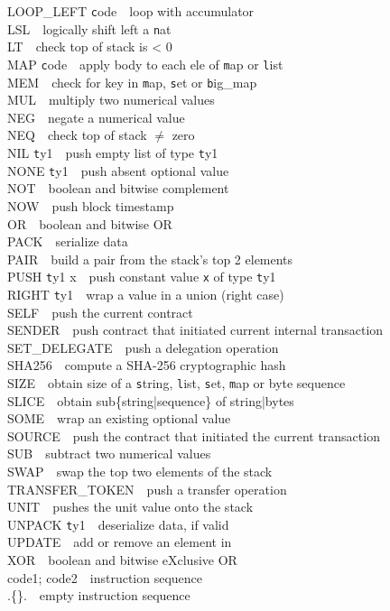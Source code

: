 \documentclass[10pt]{article}
\newcommand{\command}[2]{#1~\dotfill{}~#2\\} %
\begin{document}
\begin{multicols}{3}
\begin{flushright}
    \command{LOOP\_LEFT {\texttt code}}{loop with accumulator}
    \command{LSL}{logically shift left a {\texttt nat}}
    \command{LT}{check top of stack is < 0}
    \command{MAP {\texttt code}}{apply body to each ele of {\texttt map} or {\texttt list}}
    \command{MEM}{check for key in {\texttt map}, {\texttt set} or {\texttt big\_map}}
    \command{MUL}{multiply two numerical values}
    \command{NEG}{negate a numerical value}
    \command{NEQ}{check top of stack $\neq$ zero}
    \command{NIL {\texttt ty1}}{push empty list of type {\texttt ty1}}
    \command{NONE {\texttt ty1}}{push absent optional value}
    \command{NOT}{boolean and bitwise complement}
    \command{NOW}{push block timestamp}
    \command{OR}{boolean and bitwise OR}
    \command{PACK}{serialize data}
    \command{PAIR}{build a pair from the stack's top 2 elements}
    \command{PUSH {\texttt ty1 x}}{push constant value {\texttt x} of type {\texttt ty1}}
    \command{RIGHT {\texttt ty1}}{wrap a value in a union (right case)}
    \command{SELF}{push the current contract}
    \command{SENDER}{push contract that initiated current internal transaction}
    \command{SET\_DELEGATE}{push a delegation operation}
    \command{SHA256}{compute a SHA-256 cryptographic hash}
    \command{SIZE}{obtain size of a {\texttt string}, {\texttt list}, {\texttt set}, {\texttt map} or byte sequence}
    \command{SLICE}{obtain sub\{string|sequence\} of string|bytes}
    \command{SOME}{wrap an existing optional value}
    \command{SOURCE}{push the contract that initiated the current transaction}
    \command{SUB}{subtract two numerical values}
    \command{SWAP}{swap the top two elements of the stack}
    \command{TRANSFER\_TOKEN}{push a transfer operation}
    \command{UNIT}{pushes the unit value onto the stack}
    \command{UNPACK {\texttt ty1}}{deserialize data, if valid}
    \command{UPDATE}{add or remove an element in}
    \command{XOR}{boolean and bitwise eXclusive OR}
    \command{code1; code2}{instruction sequence}
    \command{.\{\}.}{empty instruction sequence}
  \end{flushright}
\end{multicols}

\end{document}
